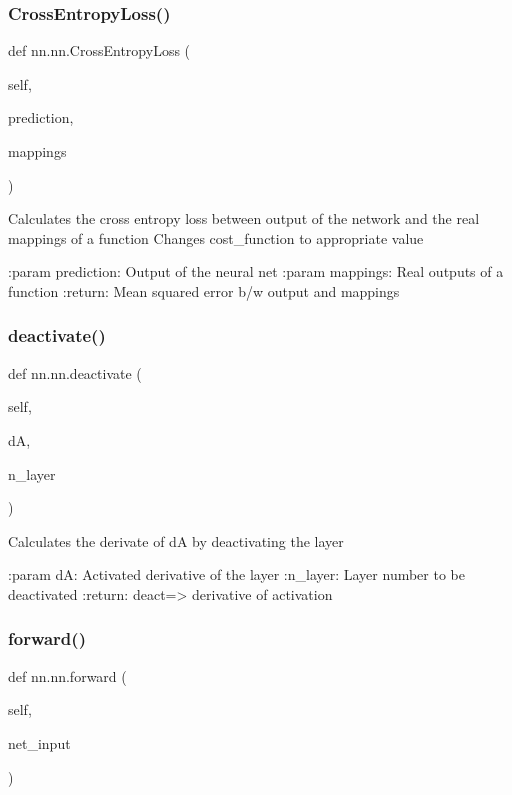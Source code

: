 \subsubsection{\texorpdfstring{Cross\+Entropy\+Loss()}{CrossEntropyLoss()}}
{\footnotesize\ttfamily def nn.\+nn.\+Cross\+Entropy\+Loss (\begin{DoxyParamCaption}\item[{}]{self,  }\item[{}]{prediction,  }\item[{}]{mappings }\end{DoxyParamCaption})}

\begin{DoxyVerb}Calculates the cross entropy loss between output of the network and the real mappings of a function
Changes cost_function to appropriate value

:param prediction: Output of the neural net
:param mappings: Real outputs of a function
:return: Mean squared error b/w output and mappings
\end{DoxyVerb}
 \mbox{\label{classnn_1_1nn_a475811849fd370a47eb0e3b7bc09b283}} 
\subsubsection{\texorpdfstring{deactivate()}{deactivate()}}
{\footnotesize\ttfamily def nn.\+nn.\+deactivate (\begin{DoxyParamCaption}\item[{}]{self,  }\item[{}]{dA,  }\item[{}]{n\+\_\+layer }\end{DoxyParamCaption})}

\begin{DoxyVerb}Calculates the derivate of dA by deactivating the layer

:param dA: Activated derivative of the layer
:n_layer: Layer number to be deactivated
:return: deact=> derivative of activation 
\end{DoxyVerb}
 \mbox{\label{classnn_1_1nn_ae07002745b03901814d92ac66fe87781}} 
\subsubsection{\texorpdfstring{forward()}{forward()}}
{\footnotesize\ttfamily def nn.\+nn.\+forward (\begin{DoxyParamCaption}\item[{}]{self,  }\item[{}]{net\+\_\+input }\end{DoxyParamCaption})}

